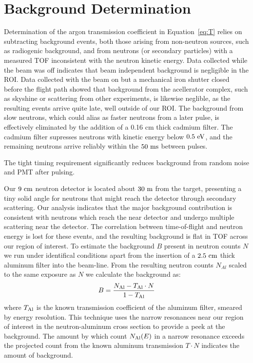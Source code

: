 \documentclass[%
 reprint,
superscriptaddress,
 preprintnumbers,
 nofootinbib,
 nobibnotes,
 bibnotes,
 amsmath,amssymb,
 aps,
 prl, 
 floatfix,
]{revtex4-1}
\begin{document}
\section{\label{sec:energy}Background Determination}

Determination of the argon transmission coefficient in
Equation~\ref{eq:T} relies on subtracting background events, both
those arising from non-neutron sources, such as radiogenic background,
and from neutrons (or secondary particles) with a measured TOF
inconsistent with the neutron kinetic energy.  Data collected while
the beam was off indicates that beam independent background is
negligible in the ROI.  Data collected with the beam on but a
mechanical iron shutter closed before the flight path showed that
background from the acellerator complex, such as skyshine or
scattering from other experiments, is likewise neglible, as the
resulting events arrive quite late, well outside of our ROI.  The
background from slow neutrons, which could alias as faster neutrons
from a later pulse, is effectively eliminated by the addition of a
0.16 cm thick cadmium filter.  The cadmium filter supresses neutrons
with kinetic energy below $0.5~\rm eV$, and the remaining neutrons
arrive reliably within the $50~\rm ms$ between pulses.

The tight timing requirement significantly reduces background from
random noise and PMT after pulsing.

Our $9~\rm cm$ neutron detector is located about $30~\rm m$ from the
target, presenting a tiny solid angle for neutrons that might reach
the detector through secondary scattering.  Our analysis indicates
that the major background contribution is consistent with neutrons
which reach the near detector and undergo multiple scattering near the
detector.  The correlation between time-of-flight and neutron energy
is lost for these events, and the resulting background is flat in TOF
across our region of interest.  To estimate the background $B$
present in neutron counts $N$ we run under identifical conditions
apart from the insertion of a $2.5~\rm cm$ thick aluminum filter into
the beam-line.  From the resulting neutron counts $N_{Al}$ scaled
to the same exposure as $N$ we calculate the background as:
\begin{equation}
  B = \frac{N_{\rm Al} - T_{\rm Al} \cdot N}{1-T_{\rm Al}}
\label{eq:B}
\end{equation}
where $T_{\rm Al}$ is the known transmission coefficient of the
aluminum filter, smeared by energy resolution.  This technique \cite{Brown:2017accapp} uses the
narrow resonances near our region of interest in the neutron-aluminum
cross section to provide a peek at the background.  The amount by
which count $N_{\rm Al}(E)$ in a narrow resonance exceeds the
projected count from the known aluminum transmission $T \cdot N$
indicates the amount of background.
\end{document}
